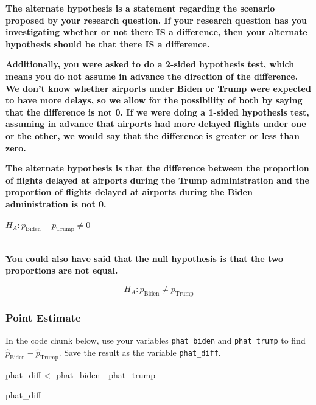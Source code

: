 \documentclass[
  letterpaper,
  DIV=11,
  numbers=noendperiod]{scrartcl}
\newenvironment{Shaded}{\begin{snugshade}}{\end{snugshade}}
\newcommand{\NormalTok}[1]{\textcolor[rgb]{0.00,0.23,0.31}{#1}}
\newcommand{\OtherTok}[1]{\textcolor[rgb]{0.00,0.23,0.31}{#1}}
\newcommand{\SpecialCharTok}[1]{\textcolor[rgb]{0.37,0.37,0.37}{#1}}
\begin{document}
\begin{tcolorbox}[enhanced jigsaw, colback=white, breakable, arc=.35mm, left=2mm, colframe=quarto-callout-warning-color-frame, opacityback=0, rightrule=.15mm, toprule=.15mm, bottomrule=.15mm, leftrule=.75mm]

\textbf{The alternate hypothesis is a statement regarding the scenario
proposed by your research question. If your research question has you
investigating whether or not there IS a difference, then your alternate
hypothesis should be that there IS a difference.}

\textbf{Additionally, you were asked to do a 2-sided hypothesis test,
which means you do not assume in advance the direction of the
difference. We don't know whether airports under Biden or Trump were
expected to have more delays, so we allow for the possibility of both by
saying that the difference is not 0. If we were doing a 1-sided
hypothesis test, assuming in advance that airports had more delayed
flights under one or the other, we would say that the difference is
greater or less than zero.}

\textbf{The alternate hypothesis is that the difference between the
proportion of flights delayed at airports during the Trump
administration and the proportion of flights delayed at airports during
the Biden administration is not 0.}

\(H_A \colon p_{\text{Biden}}-p_{\text{Trump}} \ne 0\)\\
\strut \\
\textbf{You could also have said that the null hypothesis is that the
two proportions are not equal.}

\[
H_A \colon p_{\text{Biden}} \ne p_{\text{Trump}}
\]

\end{tcolorbox}

\subsubsection{Point Estimate}\label{point-estimate}

In the code chunk below, use your variables \texttt{phat\_biden} and
\texttt{phat\_trump} to find
\(\hat{p}_{\text{Biden}}-\hat{p}_{\text{Trump}}\). Save the result as
the variable \texttt{phat\_diff}.

\begin{Shaded}
\begin{Highlighting}[]
\NormalTok{phat\_diff }\OtherTok{\textless{}{-}}\NormalTok{ phat\_biden }\SpecialCharTok{{-}}\NormalTok{ phat\_trump}

\NormalTok{phat\_diff}
\end{Highlighting}
\end{Shaded}
\end{document}
